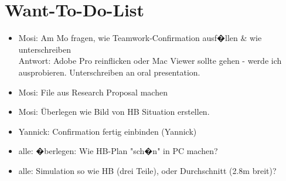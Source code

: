 
\section{Want-To-Do-List}

\begin{itemize}

\item Mosi: Am Mo fragen, wie Teamwork-Confirmation ausf�llen \& wie unterschreiben\\
Antwort: Adobe Pro reinflicken oder Mac Viewer sollte gehen - werde ich ausprobieren. Unterschreiben an oral presentation.
\item Mosi: File aus Research Proposal machen
\item Mosi: Überlegen wie Bild von HB Situation erstellen.
\item Yannick: Confirmation fertig einbinden (Yannick)

\item alle: �berlegen: Wie HB-Plan "sch�n" in PC machen?
\item alle: Simulation so wie HB (drei Teile), oder Durchschnitt (2.8m breit)?

\end{itemize}

\newpage